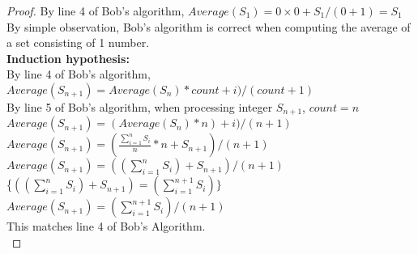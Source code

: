 \begin{problem}
\begin{proof}
      By line 4 of Bob's algorithm, $Average(S_1) = 0 \times 0 + S_1 / (0 + 1) = S_1$ \\
      By simple observation, Bob's algorithm is correct when computing the average of a set consisting of 1 number. \\
      \textbf{Induction hypothesis:} \\
      By line 4 of Bob's algorithm, $Average(S_{n+1}) = Average(S_n) * count + i) / (count + 1)$ \\
      By line 5 of Bob's algorithm, when processing integer $S_{n+1}$, $count = n$ \\
      $Average(S_{n+1}) = (Average(S_n) * n) + i) / (n+1)$ \\
      $Average(S_{n+1}) = (\frac{\sum_{i = 1}^{n} S_i}{n} * n + S_{n+1}) / (n+1)$ \\
      $Average(S_{n+1}) = ((\sum_{i = 1}^{n} S_i) + S_{n+1}) / (n + 1)$ \\
      \{$((\sum_{i = 1}^{n} S_i) + S_{n+1}) = (\sum_{i = 1}^{n+1} S_i)\}$ \\
      $Average(S_{n+1}) = (\sum_{i = 1}^{n+1} S_i) / (n + 1) $ \\
      This matches line 4 of Bob's Algorithm. \\
  \end{proof}
\end{problem}
